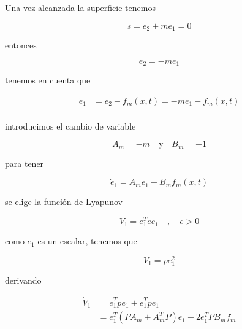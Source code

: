 \begin{flushright}
\end{flushright}

Una vez alcanzada la superficie tenemos

\begin{equation*}
    s=e_2+me_1=0
\end{equation*}

entonces

\begin{equation*}
    e_2=-me_1
\end{equation*}

tenemos en cuenta que

\begin{equation*}
    \begin{aligned}
        \dot{e}_1 &= e_2 - f_m(x,t) = -me_1 - f_m(x,t)\\
    \end{aligned}
\end{equation*}

introducimos el cambio de variable

\begin{equation*}
    A_m=-m \quad \text{y} \quad B_m=-1
\end{equation*}

para tener

\begin{equation*}
    \dot{e}_1 = A_me_1 + B_mf_m(x,t)
\end{equation*}

se elige la función de Lyapunov

\begin{equation*}
    V_1 = e_1^Tee_1 \quad , \quad e>0
\end{equation*}

como $e_1$ es un escalar, tenemos que

\begin{equation*}
    V_1=pe_1^2
\end{equation*}

derivando

\begin{equation*}
    \begin{aligned}
        \dot{V}_1 &= \dot{e}_1^Tpe_1+\dot{e}_1^Tpe_1 \\
        &= e_1^T(PA_m+A_m^TP)e_1 + 2e_1^TPB_mf_m\\
    \end{aligned}
\end{equation*}

